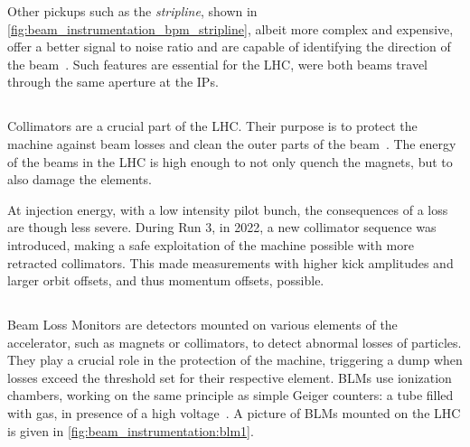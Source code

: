 Other pickups such as the \textit{stripline}, shown in
\cref{fig:beam_instrumentation_bpm_stripline}, albeit more complex and expensive, offer a better
signal to noise ratio and are capable of identifying the direction of the
beam~\cite{wendt_bpm_2020}. Such features are essential for the LHC, were both beams travel through
the same aperture at the IPs.\\ 


 
\subsection{}

Collimators are a crucial part of the LHC. Their purpose is to protect the machine against beam
losses and clean the outer parts of the beam~\cite{redaelli_lhc_2011}. The energy of the beams in
the LHC is high enough to not only quench the magnets, but to also damage the elements.

At injection energy, with a low intensity pilot bunch, the consequences of a loss are though less
severe. During Run 3, in 2022, a new collimator sequence was introduced, making a safe exploitation
of the machine possible with more retracted collimators. This made measurements with higher kick
amplitudes and larger orbit offsets, and thus momentum offsets, possible.


\subsection{}

Beam Loss Monitors are detectors mounted on various elements of the accelerator, such as magnets or
collimators, to detect abnormal losses of particles. They play a crucial role in the protection of
the machine, triggering a dump when losses exceed the threshold set for their respective element. 
BLMs use ionization chambers, working on the same principle as simple Geiger counters: a tube filled
with gas, in presence of a high voltage~\cite{schmidt_machine_2014}. A picture of BLMs mounted on
the LHC is given in \cref{fig:beam_instrumentation:blm1}.

